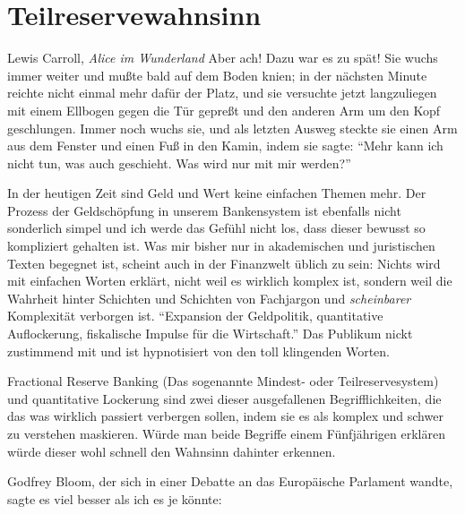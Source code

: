 \chapter{Teilreservewahnsinn}
\label{les:13}

\begin{chapquote}{Lewis Carroll, \textit{Alice im Wunderland}}
Aber ach! Dazu war es zu spät! Sie wuchs immer weiter und mußte bald auf dem
Boden knien; in der nächsten Minute reichte nicht einmal mehr dafür der Platz,
und sie versuchte jetzt langzuliegen mit einem Ellbogen gegen die Tür gepreßt
und den anderen Arm um den Kopf geschlungen. Immer noch wuchs sie, und als
letzten Ausweg steckte sie einen Arm aus dem Fenster und einen Fuß in den Kamin,
indem sie sagte: \enquote{Mehr kann ich nicht tun, was auch geschieht. Was wird
nur mit mir werden?}
\end{chapquote}

In der heutigen Zeit sind Geld und Wert keine einfachen Themen mehr. Der Prozess
der Geldschöpfung in unserem Bankensystem ist ebenfalls nicht sonderlich simpel
und ich werde das Gefühl nicht los, dass dieser bewusst so kompliziert gehalten
ist. Was mir bisher nur in akademischen und juristischen Texten begegnet ist,
scheint auch in der Finanzwelt üblich zu sein: Nichts wird mit einfachen Worten
erklärt, nicht weil es wirklich komplex ist, sondern weil die Wahrheit hinter
Schichten und Schichten von Fachjargon und \textit{scheinbarer} Komplexität
verborgen ist. \enquote{Expansion der Geldpolitik, quantitative Auflockerung,
fiskalische Impulse für die Wirtschaft.} Das Publikum nickt zustimmend mit und
ist hypnotisiert von den toll klingenden Worten.

Fractional Reserve Banking (Das sogenannte Mindest- oder Teilreservesystem) und
quantitative Lockerung sind zwei dieser ausgefallenen Begrifflichkeiten, die das
was wirklich passiert verbergen sollen, indem sie es als komplex und schwer zu
verstehen maskieren. Würde man beide Begriffe einem Fünfjährigen erklären würde
dieser wohl schnell den Wahnsinn dahinter erkennen.

Godfrey Bloom, der sich in einer Debatte an das Europäische Parlament wandte,
sagte es viel besser als ich es je könnte:

